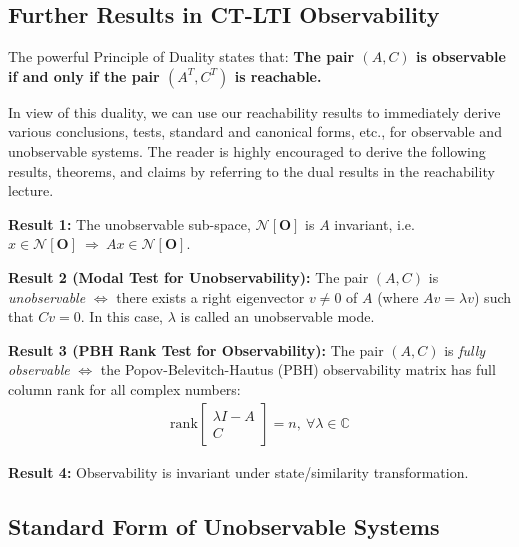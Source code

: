 \documentclass[twoside]{article}
\begin{document}
\subsection{Further Results in CT-LTI Observability}

The powerful Principle of Duality states that: \textbf{The pair $(A, C)$ is observable if and only if the pair $(A^T, C^T)$ is reachable.}

In view of this duality, we can use our reachability results to immediately derive various conclusions, tests,
standard and canonical forms, etc., for observable and unobservable systems. The reader is highly encouraged to 
derive the following results, theorems, and claims by referring to the dual results in the reachability lecture.

\textbf{Result 1:} The unobservable sub-space, $\mathcal{N} [\mathbf{O}] $ is $A$ invariant, i.e. $x\in \mathcal{N} [\mathbf{O}]  \ \Rightarrow \ A x \in \mathcal{N} [\mathbf{O}] $. 

\textbf{Result 2 (Modal Test for Unobservability):} The pair $(A,C)$ is \textit{unobservable} $\iff$ there exists a right eigenvector $v \neq 0$ of $A$ (where $A v = \lambda v$) such that $C v = 0$. In this case, $\lambda$ is called an unobservable mode.

\textbf{Result 3 (PBH Rank Test for Observability):} The pair $(A,C)$ is \textit{fully observable} $\iff$ the Popov-Belevitch-Hautus (PBH) observability matrix has full column rank for all complex numbers:
\begin{align*}
\mathrm{rank} \left[ \begin{array}{c} \lambda I - A \\ \hline C \end{array} \right] = n , \ \forall \lambda \in \mathbb{C}
\end{align*}

\textbf{Result 4:} Observability is invariant under state/similarity transformation. 

\subsection{Standard Form of Unobservable Systems}
\end{document}
